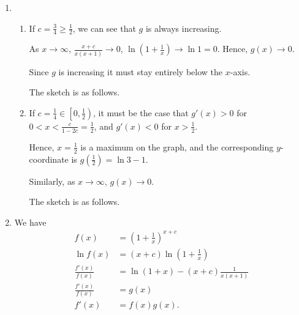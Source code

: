 \begin{enumerate}
    \item \begin{enumerate}
              \item If \(c = \frac{3}{4} \geq \frac{1}{2}\), we can see that \(g\) is always increasing.

                    As \(x \to \infty\), \(\frac{x + c}{x (x + 1)} \to 0\), \(\ln \left(1 + \frac{1}{x}\right) \to \ln 1 = 0\). Hence, \(g(x) \to 0\).

                    Since \(g\) is increasing it must stay entirely below the \(x\)-axis.

                    The sketch is as follows.

                    \begin{center}
                        
                    \end{center}

              \item If \(c = \frac{1}{4} \in \left[0, \frac{1}{2}\right)\), it must be the case that \(g'(x) > 0\) for \(0 < x < \frac{c}{1 - 2c} = \frac{1}{2}\), and \(g'(x) < 0\) for \(x > \frac{1}{2}\).

                    Hence, \(x = \frac{1}{2}\) is a maximum on the graph, and the corresponding \(y\)-coordinate is \(g\left(\frac{1}{2}\right) = \ln 3 - 1\).

                    Similarly, as \(x \to \infty\), \(g(x) \to 0\).

                    The sketch is as follows.

                    \begin{center}
                        
                    \end{center}
          \end{enumerate}

    \item We have
          \begin{align*}
              f(x)               & = \left(1 + \frac{1}{x}\right)^{x + c}                 \\
              \ln f(x)           & = (x + c) \ln \left(1 + \frac{1}{x}\right)             \\
              \frac{f'(x)}{f(x)} & = \ln \left(1 + x\right) - (x + c) \frac{1}{x (x + 1)} \\
              \frac{f'(x)}{f(x)} & = g(x)                                                 \\
              f'(x)              & = f(x) g(x).
          \end{align*}


\end{enumerate}
